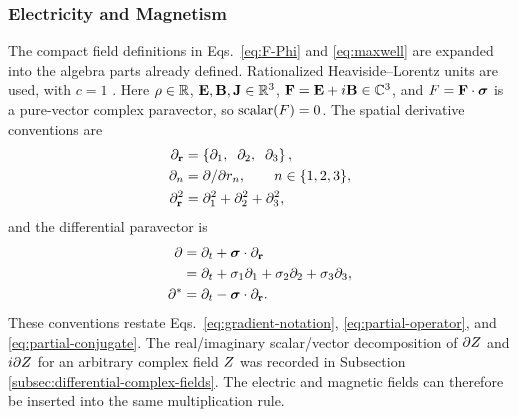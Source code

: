\subsubsection{Electricity and Magnetism}
The compact field definitions in Eqs.\ \eqref{eq:F-Phi} and
\eqref{eq:maxwell} are expanded into the algebra parts already defined.
Rationalized Heaviside--Lorentz units are used, with \(c=1\)
\cite{jackson1998}. Here \(\rho\in\mathbb{R}\),
\(\mathbf{E},\mathbf{B},\mathbf{J}\in\mathbb{R}^3\),
\(\mathbf{F}=\mathbf{E}+i\mathbf{B}\in\mathbb{C}^3\), and
\(F=\mathbf{F}\cdot\mathbf{\bm{\sigma}}\) is a pure-vector complex paravector, so
\(\operatorname{scalar}(F)=0\). The spatial derivative conventions are
\begin{align*}
\partial_{\mathbf{r}} &= \left\{\partial_1,\mkern10mu \partial_2,\mkern10mu \partial_3\right\}, \\
\partial_n &= \partial/\partial r_n,\qquad n\in\{1,2,3\}, \\
\partial_{\mathbf{r}}^2 &= \partial_1^2+\partial_2^2+\partial_3^2,
\end{align*}
and the differential paravector is
\begin{align*}
\partial
&= \partial_t+\mathbf{\bm{\sigma}}\cdot\partial_{\mathbf{r}}\notag\\
&= \partial_t+\sigma_1\partial_1+\sigma_2\partial_2+\sigma_3\partial_3,\\
\partial^{*}
&= \partial_t-\mathbf{\bm{\sigma}}\cdot\partial_{\mathbf{r}}.
\end{align*}
These conventions restate Eqs.\ \eqref{eq:gradient-notation},
\eqref{eq:partial-operator}, and \eqref{eq:partial-conjugate}. The
real/imaginary scalar/vector decomposition of
\(\partial Z\) and \(i\partial Z\) for an arbitrary
complex field \(Z\) was recorded in Subsection
\ref{subsec:differential-complex-fields}. The electric and magnetic fields
can therefore be inserted into the same multiplication rule.

